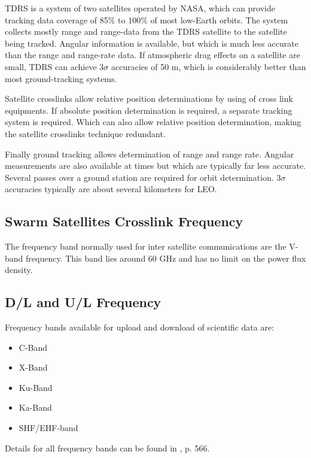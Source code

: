 TDRS is a system of two satellites operated by NASA, which can provide tracking data coverage of 85\% to 100\% of most low-Earth orbits. The system collects mostly range and range-data from the TDRS satellite to the satellite being tracked. Angular information is available, but which is much less accurate than the range and range-rate data. If atmospheric drag effects on a satellite are small, TDRS can achieve 3$\sigma$ accuracies of 50 m, which is considerably better than most ground-tracking systems.

Satellite crosslinks allow relative position determinations by using of cross link equipments. If absolute position determination is required, a separate tracking system is required. Which can also allow relative position determination, making the satellite crosslinks technique redundant.

Finally ground tracking allows determination of range and range rate. Angular measurements are also available at times but which are typically far less accurate. Several passes over a ground station are required for orbit determination. 3$\sigma$ accuracies typically are about several kilometers for \ac{LEO}.

\subsection{Swarm Satellites Crosslink Frequency}
The frequency band normally used for inter satellite communications are the V-band frequency. This band lies around 60 GHz and has no limit on the power flux density.

\subsection{D/L and U/L Frequency}
Frequency bands available for upload and download of scientific data are:
\begin{itemize}
\item C-Band
\item X-Band
\item Ku-Band
\item Ka-Band
\item SHF/EHF-band
\end{itemize}

Details for all frequency bands can be found in \cite{larson}, p. 566.

